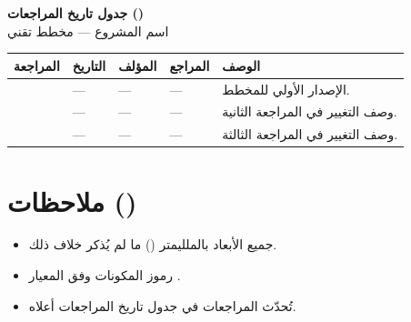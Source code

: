 \documentclass[11pt,a4paper,landscape]{article}
\begin{document}
\newpage

\begin{center}
{\LARGE\bfseries جدول تاريخ المراجعات ()}\\[0.5em]
{\large اسم المشروع --- مخطط تقني}\\[1em]
\end{center}

\begin{table}[H]
\centering
\renewcommand{\arraystretch}{1.4}
\begin{tabularx}{\textwidth}{C{1.5cm} C{2.5cm} L{3cm} L{3cm} X}
\toprule
\textbf{المراجعة} & \textbf{التاريخ} & \textbf{المؤلف} & \textbf{المراجع} & \textbf{الوصف} \\
\midrule
{} & --- & --- & --- & الإصدار الأولي للمخطط. \\
 & --- & --- & --- & %
       وصف التغيير في المراجعة الثانية. \\
 & --- & --- & --- & %
       وصف التغيير في المراجعة الثالثة. \\
\bottomrule
\end{tabularx}
\end{table}

\vspace{1em}

\section{ملاحظات ()}
\begin{itemize}
    \item جميع الأبعاد بالملليمتر () ما لم يُذكر خلاف ذلك.
    \item رموز المكونات وفق المعيار .
    \item تُحدّث المراجعات في جدول تاريخ المراجعات أعلاه.
\end{itemize}
\end{document}
